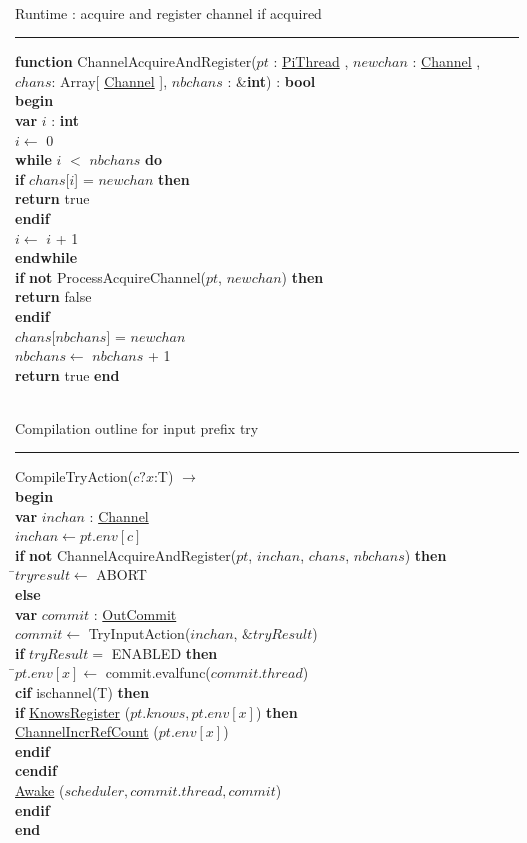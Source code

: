 \documentclass[a4paper,11pt]{article}
\newenvironment{program}{
  \begin{sffamily}
  \begin{scriptsize}
  \begin{tabbing}}
 {\end{tabbing}
  \end{scriptsize}
  \end{sffamily}}
\newcommand{\kw}[1]{\textsf{\textbf{#1}}}
\newcommand{\pindent}{\hspace{2em}\=}
\newcommand{\compiletime}[1]{\textcolor{compilecolor}{#1}}
\newcommand{\algotitle}[1]{\noindent\\ \noindent#1\par\nobreak\vspace{3pt}\hrule\vspace{6pt}}
\newcommand{\algosection}[1]{
  \phantomsection
  \algotitle{#1}
}
\newcommand{\myref}[1]{
  \hyperref[#1]{#1}
}
\begin{document}
\algosection{Runtime : acquire and register channel if acquired}
\begin{program}
  \kw{function} ChannelAcquireAndRegister($pt$ : \myref{PiThread}, $newchan$ : \myref{Channel}, $chans$: Array[\myref{Channel}], $nbchans$ : \&\kw{int}) : \kw{bool} \\
  \kw{begin}\\
  \pindent \kw{var} $i$ : \kw{int} \\
  \> $i \leftarrow$ 0 \\
  \> \kw{while} $i$ $<$ $nbchans$ \kw{do}\\
  \> \pindent \kw{if} $chans$[$i$] = $newchan$ \kw{then} \\
  \> \> \pindent \kw{return} true \\
  \> \> \kw{endif} \\
  \> \> $i \leftarrow$ $i$ + 1 \\
  \> \kw{endwhile} \\
  \> \kw{if} \kw{not} ProcessAcquireChannel($pt$, $newchan$) \kw{then} \\
  \>\> \kw{return} false \\
  \> \kw{endif} \\
  \> $chans$[$nbchans$] = $newchan$ \\
  \> $nbchans \leftarrow$ $nbchans$ + 1 \\
  \> \kw{return} true
  \kw{end}
\end{program}

\algosection{Compilation outline for input prefix try}
\begin{program}
  \compiletime{CompileTryAction($c?x$:T) $\rightarrow$} \\ 
  \kw{begin} \\
  \pindent \kw{var} $inchan$ : \myref{Channel} \\
  \> $inchan \leftarrow pt.env[c]$ \\
  \> \kw{if} \kw{not} ChannelAcquireAndRegister($pt$, $inchan$, $chans$, $nbchans$) \kw{then} \\
  \> \pindent $tryresult \leftarrow$ ABORT \\
  \> \kw{else} \\
  \>\>\kw{var} $commit$ : \myref{OutCommit} \\
  \>\> $commit \leftarrow$ TryInputAction($inchan$, $\& tryResult$) \\
  \>\>\kw{if} $tryResult =$ ENABLED \kw{then} \\
  \>\>\pindent $pt.env[x] \leftarrow$ commit.evalfunc($commit.thread$) \\
  \>\>\>\compiletime{\kw{cif} ischannel(T) \kw{then}} \\
  \>\>\>\pindent\kw{if} \myref{KnowsRegister}($pt.knows, pt.env[x]$) \kw{then} \\
  \>\>\>\>\pindent \myref{ChannelIncrRefCount}($pt.env[x]$) \\
  \>\>\>\>\kw{endif} \\
  \>\>\>\compiletime{\kw{cendif}} \\
  \>\>\>\myref{Awake}($scheduler, commit.thread, commit$) \\
  \>\>\kw{endif} \\
  \kw{end}
\end{program}
\end{document}
